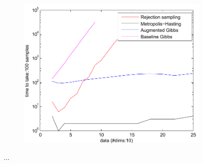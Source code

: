 \begin{figure}
\begin{subfigure}{.40\textwidth}
  \centering
  \includegraphics[width=1.05\textwidth]{pic/dim10analysis.pdf}%
  \caption{}
  \label{fig:error-samples-bppl}
\end{subfigure}%
\caption{
\footnotesize
...%
}
\label{fig:results}
\end{figure}
